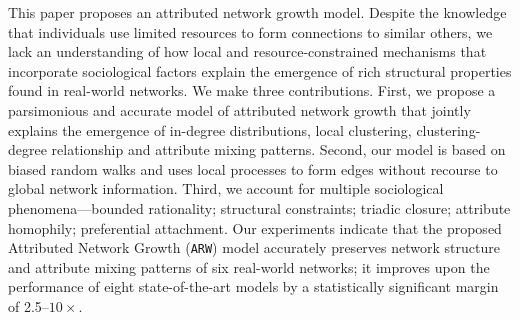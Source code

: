 
This paper proposes an attributed network growth model. Despite the knowledge
that individuals use limited resources to form connections to similar others, we
lack an understanding of how local and resource-constrained mechanisms that
incorporate sociological factors explain the emergence of rich structural
properties found in real-world networks. We make three contributions. First, we
propose a parsimonious and accurate model of attributed network growth that
jointly explains the emergence of in-degree distributions, local clustering,
clustering-degree relationship and attribute mixing patterns. Second, our model
is based on biased random walks and uses local processes to form edges without
recourse to global network information. Third, we account for multiple
sociological phenomena---bounded rationality; structural constraints; triadic
closure; attribute homophily; preferential attachment. Our experiments indicate
that the proposed Attributed Network Growth (\texttt{ARW}) model accurately
preserves network structure and attribute mixing patterns of six real-world
networks; it improves upon the performance of eight state-of-the-art models by a
statistically significant margin of 2.5--$10\times$.

%
%
